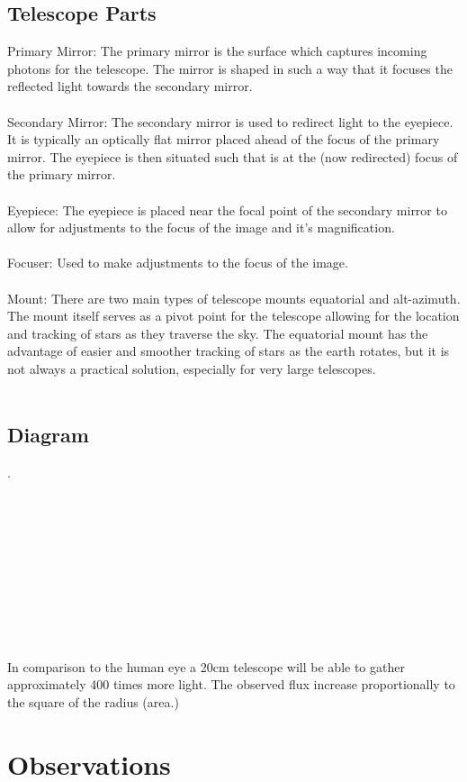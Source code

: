 \documentclass{article}
\begin{document}
\subsection{Telescope Parts}
Primary Mirror: The primary mirror is the surface which captures incoming photons for the telescope. The mirror is shaped in such a way that it focuses the reflected light towards the secondary mirror.\\\\
Secondary Mirror: The secondary mirror is used to redirect light to the eyepiece. It is typically an optically flat mirror placed ahead of the focus of the primary mirror. The eyepiece is then situated such that is at the (now redirected) focus of the primary mirror.\\\\
Eyepiece: The eyepiece is placed near the focal point of the secondary mirror to allow for adjustments to the focus of the image and it's magnification.\\\\
Focuser: Used to make adjustments to the focus of the image.\\\\
Mount: There are two main types of telescope mounts equatorial and alt-azimuth. The mount itself serves as a pivot point for the telescope allowing for the location and tracking of stars as they traverse the sky. The equatorial mount has the advantage of easier and smoother tracking of stars as the earth rotates, but it is not always a practical solution, especially for very large telescopes.\\\\
\subsection{Diagram}
.\\
 \\
 \\
 \\
 \\
 \\
 \\
 \\
 \\
 \\
 \\
In comparison to the human eye a 20cm telescope will be able to gather approximately 400 times more light. The observed flux increase proportionally to the square of the radius (area.) 
\section{Observations}
\end{document}
